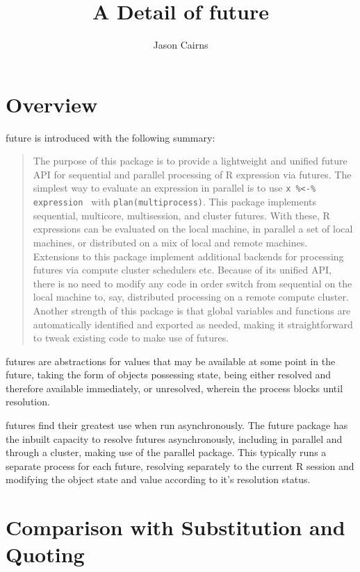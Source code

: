 \documentclass[10pt,a4paper]{article}
\begin{document}
\title{A Detail of future}
\author{Jason Cairns}
  
\maketitle{}

\section{Overview}
\label{sec:overview}
\nocite{bengtsson19:_futur_r}

future is introduced with the following summary: \blockquote{The
purpose of this package is to provide a lightweight and unified
future API for sequential and parallel processing of R expression
via futures. The simplest way to evaluate an expression in parallel
is to use \texttt{x \%<-\% { expression }} with
\texttt{plan(multiprocess)}. This package implements sequential,
multicore, multisession, and cluster futures. With these, R
expressions can be evaluated on the local machine, in parallel a set
of local machines, or distributed on a mix of local and remote
machines. Extensions to this package implement additional backends
for processing futures via compute cluster schedulers etc. Because
of its unified API, there is no need to modify any code in order
switch from sequential on the local machine to, say, distributed
processing on a remote compute cluster. Another strength of this
package is that global variables and functions are automatically
identified and exported as needed, making it straightforward to
tweak existing code to make use of futures.\cite{bengtsson20}}
futures are abstractions for values that may be available at some
point in the future, taking the form of objects possessing state,
being either resolved and therefore available immediately, or
unresolved, wherein the process blocks until resolution.

futures find their greatest use when run asynchronously. The future
package has the inbuilt capacity to resolve futures asynchronously,
including in parallel and through a cluster, making use of the
parallel package. This typically runs a separate process for each
future, resolving separately to the current R session and modifying
the object state and value according to it's resolution status.

\section{Comparison with Substitution and Quoting}
\label{sec:comparison-with-non}
\end{document}
